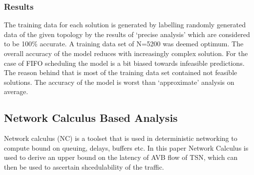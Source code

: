 \documentclass[journal,12pt,twocolumn]{IEEEtran}
\begin{document}
\subsubsection{Results}
The training data for each solution is generated by labelling randomly generated data of the given topology by the results of `precise analysis' \cite{8,9,37} which are considered to be 100\% accurate. A training data set of N=5200 was deemed optimum.
The overall accuracy of the model reduces with increasingly complex solution. For the case of FIFO scheduling the model is a bit biased towards infeasible predictions. The reason behind that is most of the training data set contained not feasible solutions.
The accuracy of the model is worst than `approximate' analysis on average.
\subsection {Network Calculus Based Analysis}
Network calculus (NC) is a toolset that is used in deterministic networking to compute bound on queuing, delays, buffers etc. In this paper \cite{NC} Network Calculus is used to derive an upper bound on the latency of AVB flow of TSN, which can then be used to ascertain shcedulability of the traffic.
\end{document}
